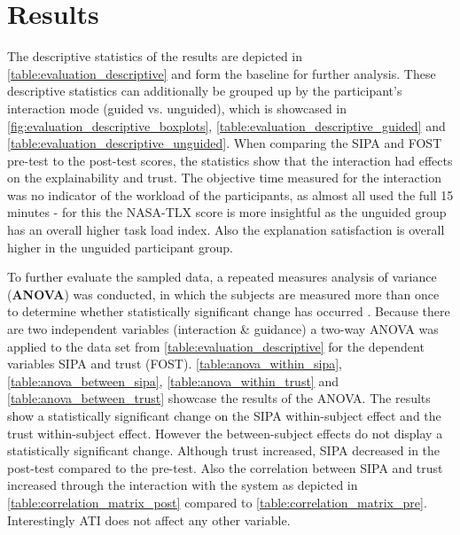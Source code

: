 \documentclass[11pt,a4paper,english]{scrreprt}
\begin{document}
\section{Results}\label{section:evaluation_results}
The descriptive statistics of the results are depicted in \autoref{table:evaluation_descriptive} and form the baseline for further analysis. These descriptive statistics can additionally be grouped up by the participant's interaction mode (guided vs. unguided), which is showcased in \autoref{fig:evaluation_descriptive_boxplots}, \autoref{table:evaluation_descriptive_guided} and \autoref{table:evaluation_descriptive_unguided}. When comparing the SIPA and FOST pre-test to the post-test scores, the statistics show that the interaction had effects on the explainability and trust. The objective time measured for the interaction was no indicator of the workload of the participants, as almost all used the full 15 minutes - for this the NASA-TLX score is more insightful as the unguided group has an overall higher task load index. Also the explanation satisfaction is overall higher in the unguided participant group.

To further evaluate the sampled data, a repeated measures analysis of variance (\textbf{ANOVA}) was conducted, in which the subjects are measured more than once to determine whether statistically significant change has occurred \parencite{vogt_dictionary_2011}. Because there are two independent variables (interaction \& guidance) a two-way ANOVA was applied to the data set from \autoref{table:evaluation_descriptive} for the dependent variables SIPA and trust (FOST). \autoref{table:anova_within_sipa}, \autoref{table:anova_between_sipa}, \autoref{table:anova_within_trust} and \autoref{table:anova_between_trust} showcase the results of the ANOVA. The results show a statistically significant change on the SIPA within-subject effect and the trust within-subject effect. However the between-subject effects do not display a statistically significant change. Although trust increased, SIPA decreased in the post-test compared to the pre-test. Also the correlation between SIPA and trust increased through the interaction with the system as depicted in \autoref{table:correlation_matrix_post} compared to \autoref{table:correlation_matrix_pre}. Interestingly ATI does not affect any other variable.
\end{document}
